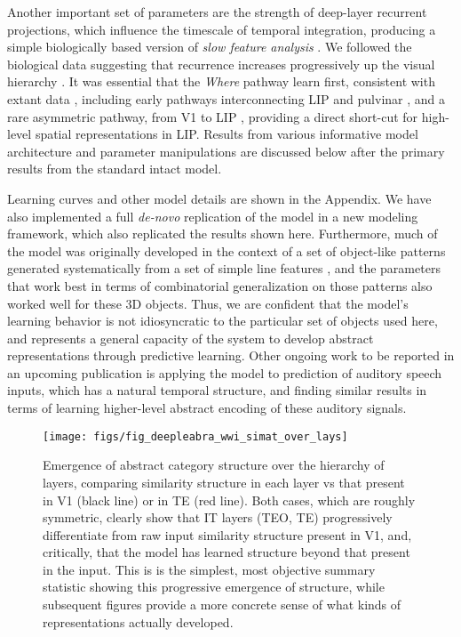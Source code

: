 \documentclass[11pt,twoside]{article}
\newif\myifpdf
\begin{document}
Another important set of parameters are the strength of deep-layer recurrent projections, which influence the timescale of temporal integration, producing a simple biologically based version of \emph{slow feature analysis} \citep{WiskottSejnowski02,Foldiak91}. We followed the biological data suggesting that recurrence increases progressively up the visual hierarchy \citep{ChaudhuriKnoblauchGarielEtAl15}.  It was essential that the \emph{Where} pathway learn first, consistent with extant data \citep{BourneRosa06,KiorpesPriceHall-HaroEtAl12}, including early pathways interconnecting LIP and pulvinar \citep{BridgeLeopoldBourne16}, and a rare asymmetric pathway, from V1 to LIP \citep{MarkovErcsey-RavaszGomesEtAl14}, providing a direct short-cut for high-level spatial representations in LIP.  Results from various informative model architecture and parameter manipulations are discussed below after the primary results from the standard intact model.

Learning curves and other model details are shown in the Appendix.  We have also implemented a full \emph{de-novo} replication of the model in a new modeling framework, which also replicated the results shown here.  Furthermore, much of the model was originally developed in the context of a set of object-like patterns generated systematically from a set of simple line features \cite{OReillyWyatteRohrlich17}, and the parameters that work best in terms of combinatorial generalization on those patterns also worked well for these 3D objects.  Thus, we are confident that the model's learning behavior is not idiosyncratic to the particular set of objects used here, and represents a general capacity of the system to develop abstract representations through predictive learning.  Other ongoing work to be reported in an upcoming publication is applying the model to prediction of auditory speech inputs, which has a natural temporal structure, and finding similar results in terms of learning higher-level abstract encoding of these auditory signals.

\begin{figure}
  \centering\texttt{[image: figs/fig\_deepleabra\_wwi\_simat\_over\_lays]}
  \caption{\footnotesize Emergence of abstract category structure over the hierarchy of layers, comparing similarity structure in each layer vs that present in V1 (black line) or in TE (red line).  Both cases, which are roughly symmetric, clearly show that IT layers (TEO, TE) progressively differentiate from raw input similarity structure present in V1, and, critically, that the model has learned structure beyond that present in the input.  This is is the simplest, most objective summary statistic showing this progressive emergence of structure, while subsequent figures provide a more concrete sense of what kinds of representations actually developed.}
  \label{fig.simat-lays}
\end{figure}
\end{document}
